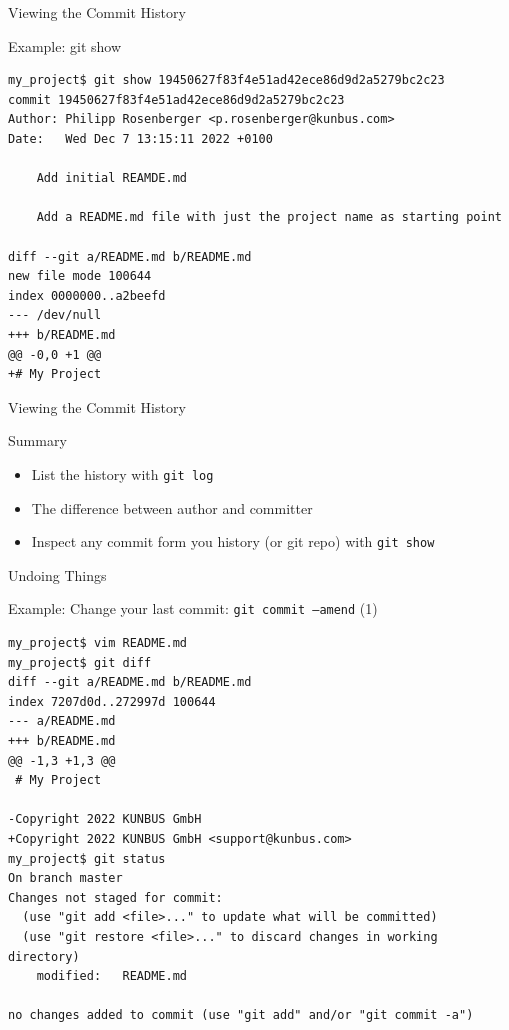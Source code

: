 \documentclass[aspectratio=169]{beamer}
\renewcommand{\footnotesize}{\tiny}
\newcommand{\sectiontitle}{}
\begin{document}
\begin{frame}[fragile]{Viewing the Commit History}{\sectiontitle}
\begin{block}{Example: \ttfamily git show}
\begin{verbatim}
my_project$ git show 19450627f83f4e51ad42ece86d9d2a5279bc2c23
commit 19450627f83f4e51ad42ece86d9d2a5279bc2c23
Author: Philipp Rosenberger <p.rosenberger@kunbus.com>
Date:   Wed Dec 7 13:15:11 2022 +0100

    Add initial REAMDE.md
    
    Add a README.md file with just the project name as starting point

diff --git a/README.md b/README.md
new file mode 100644
index 0000000..a2beefd
--- /dev/null
+++ b/README.md
@@ -0,0 +1 @@
+# My Project
\end{verbatim}
\end{block}
\end{frame}

\begin{frame}[fragile]{Viewing the Commit History}{\sectiontitle}
\begin{block}{Summary}
\begin{itemize}
    \item List the history with \verb|git log|
    \item The difference between author and committer 
    \item Inspect any commit form you history (or git repo) with \verb|git show|
\end{itemize}
\end{block}
\end{frame}

\begin{frame}[fragile]{Undoing Things}{\sectiontitle}
\begin{block}{Example: Change your last commit: \texttt{git commit --amend} {\small(1)}}
\begin{verbatim}
my_project$ vim README.md
my_project$ git diff
diff --git a/README.md b/README.md
index 7207d0d..272997d 100644
--- a/README.md
+++ b/README.md
@@ -1,3 +1,3 @@
 # My Project
 
-Copyright 2022 KUNBUS GmbH
+Copyright 2022 KUNBUS GmbH <support@kunbus.com>
my_project$ git status 
On branch master
Changes not staged for commit:
  (use "git add <file>..." to update what will be committed)
  (use "git restore <file>..." to discard changes in working directory)
    modified:   README.md

no changes added to commit (use "git add" and/or "git commit -a")
\end{verbatim}
\end{block}
\end{frame}
\end{document}
